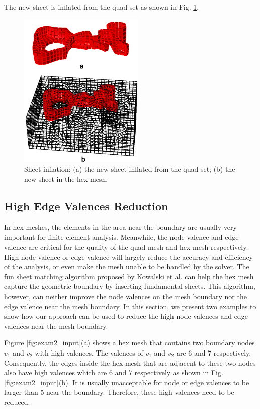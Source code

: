 \documentclass[final,5p,times,twocolumn]{elsarticle}
\begin{document}
The new sheet is inflated from the quad set as shown in Fig. \ref{fig:exam1_sheet}.

\begin{figure}[htbp]
\begin{center}
\includegraphics[width=6cm]{exam1_sheet.png}
\caption{Sheet inflation: (a) the new sheet inflated from the quad set; (b) the new sheet in the hex mesh.}
\label{fig:exam1_sheet}
\end{center}
\end{figure}

\subsection{High Edge Valences Reduction}
\label{sec:red_edge_val}
In hex meshes, the elements in the area near the boundary are usually very important for finite element analysis\cite{Kowalski2011}. Meanwhile, the node valence and edge valence are critical for the quality of the quad mesh and hex mesh respectively\cite{Owen1998, Staten2010d,Tarini2010}. High node valence or edge valence will largely reduce the accuracy and efficiency of the analysis, or even make the mesh unable to be handled by the solver. The fun sheet matching algorithm proposed by Kowalski et al. \cite{Kowalski2011} can help the hex mesh capture the geometric boundary by inserting fundamental sheets. This algorithm, however, can neither improve the node valences on the mesh boundary nor the edge valence near the mesh boundary. In this section, we present two examples to show how our approach can be used to reduce the high node valences and edge valences near the mesh boundary.

Figure \ref{fig:exam2_input}(a) shows a hex mesh that contains two boundary nodes $v_1$ and $v_2$ with high valences. The valences of $v_1$ and $v_2$ are 6 and 7 respectively. Consequently, the edges inside the hex mesh that are adjacent to these two nodes also have high valences which are 6 and 7 respectively as shown in Fig. \ref{fig:exam2_input}(b). It is usually unacceptable for node or edge valences to be larger than 5 near the boundary. Therefore, these high valences need to be reduced.
\end{document}
